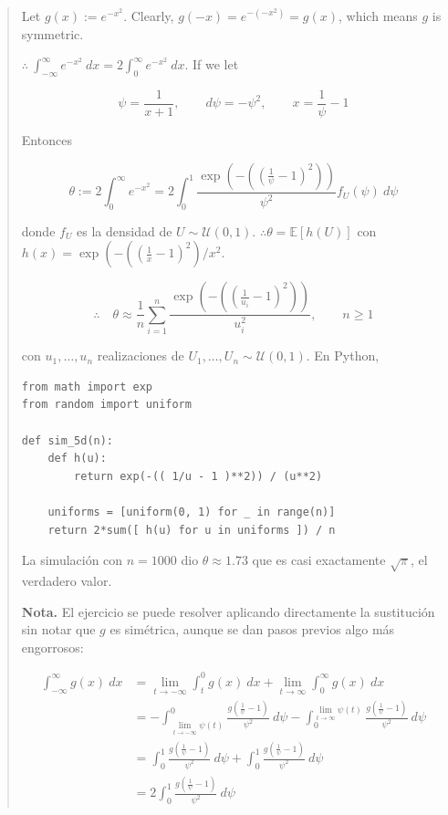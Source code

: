 \documentclass[a4paper, 12pt]{article}
\begin{document}
\small
\begin{quote}

Let $g(x) := e^{-x^2}$. Clearly, $g(-x) = e^{-(-x^2)} = g(x)$, which means $g$
is symmetric.

$\therefore ~ \int_{-\infty}^\infty e^{-x^2} ~ dx = 2\int_0^\infty e^{-x^2} ~
dx$. If we let 

\begin{equation*}
  \psi = \frac{1}{x+1}, \qquad d \psi = -\psi^2, \qquad x = \frac{1}{\psi}-1
\end{equation*}

Entonces

\begin{equation*}
  \theta := 2\int_0^\infty e^{-x^2} = 2\int_0^1 \frac{\exp\left(-\left(\left(\frac{1}{\psi} -
  1\right)^2\right)\right)}{\psi^2} f_U(\psi) ~ d\psi
\end{equation*}

donde $f_U$ es la densidad de $U \sim \mathcal{U}(0, 1)$. $\therefore
\theta = \mathbb{E}\left[ h(U) \right] $ con $h(x) =
\exp\left(-\left(\left(\frac{1}{x}-1\right)^2\right) /
x^2$. 

\begin{equation*}
  \therefore \quad \theta \approx \frac{1}{n}\sum_{i=1}^n 
  \frac{\exp\left(-\left(\left(\frac{1}{u_i} - 1\right)^2\right)\right)}{u_i^2}, \qquad n \geq 1
\end{equation*}

con $u_1, \ldots, u_n$ realizaciones de $U_1, \ldots, U_n \sim \mathcal{U}(0,
1)$. En Python,

\footnotesize 

\begin{verbatim}
from math import exp 
from random import uniform
  
def sim_5d(n):
    def h(u):
        return exp(-(( 1/u - 1 )**2)) / (u**2)

    uniforms = [uniform(0, 1) for _ in range(n)]
    return 2*sum([ h(u) for u in uniforms ]) / n
\end{verbatim}

\small 

La simulación con $n = 1000$ dio $\theta \approx 1.73$ que es casi exactamente
$\sqrt{\pi}$, el verdadero valor.

\textbf{Nota.} El ejercicio se puede resolver aplicando directamente la
sustitución sin notar que $g$ es simétrica, aunque se dan pasos previos algo más
engorrosos:

\begin{align*}
  \int_{-\infty}^\infty g(x) ~ dx 
  &= \lim_{t \to -\infty}\int_t^0 g(x) ~dx +
  \lim_{t \to \infty} \int_0^\infty g(x) ~ dx \\ 
  &=-\int_{\lim_{t \to -\infty} \psi(t)}^0 \frac{ g(\frac{1}{\psi} - 1) }{\psi^2}
  ~ d\psi - \int_0^{ \lim_{t \to \infty} \psi(t)} 
  \frac{g(\frac{1}{\psi} - 1)}{\psi^2} ~ d\psi \\ 
  &=\int_0^1 \frac{g(\frac{1}{\psi} - 1)}{\psi^2} ~ d\psi + \int_0^1
  \frac{g(\frac{1}{\psi} - 1)}{\psi^2} ~ d\psi \\ 
  &= 2 \int_0^1 \frac{g(\frac{1}{\psi} - 1)}{\psi^2} ~ d\psi
\end{align*}


\end{quote}
\end{document}
